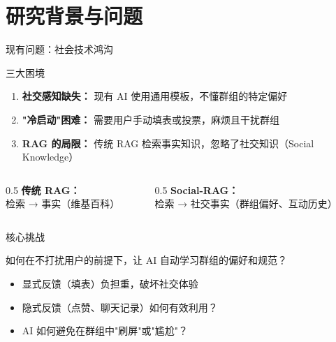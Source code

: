 \documentclass[UTF8,aspectratio=169]{ctexbeamer}
\begin{document}
\section{研究背景与问题}

\begin{frame}{现有问题：社会技术鸿沟}
\begin{block}{三大困境}
\begin{enumerate}
\item \textbf{社交感知缺失：} 现有 AI 使用通用模板，不懂群组的特定偏好
\item \textbf{"冷启动"困难：} 需要用户手动填表或投票，麻烦且干扰群组
\item \textbf{RAG 的局限：} 传统 RAG 检索事实知识，忽略了社交知识（Social Knowledge）
\end{enumerate}
\end{block}

\vspace{0.3cm}

\begin{columns}[T]
\begin{column}{0.5\textwidth}
\textbf{传统 RAG：} \\
检索 → 事实（维基百科）
\end{column}
\begin{column}{0.5\textwidth}
\textbf{Social-RAG：} \\
检索 → 社交事实（群组偏好、互动历史）
\end{column}
\end{columns}
\end{frame}

\begin{frame}{核心挑战}
\begin{center}
\Large
\textcolor{myblue}{如何在不打扰用户的前提下，让 AI 自动学习群组的偏好和规范？}
\end{center}

\vspace{1cm}

\begin{itemize}
\item 显式反馈（填表）负担重，破坏社交体验
\item 隐式反馈（点赞、聊天记录）如何有效利用？
\item AI 如何避免在群组中"刷屏"或"尴尬"？
\end{itemize}
\end{frame}

\end{document}
